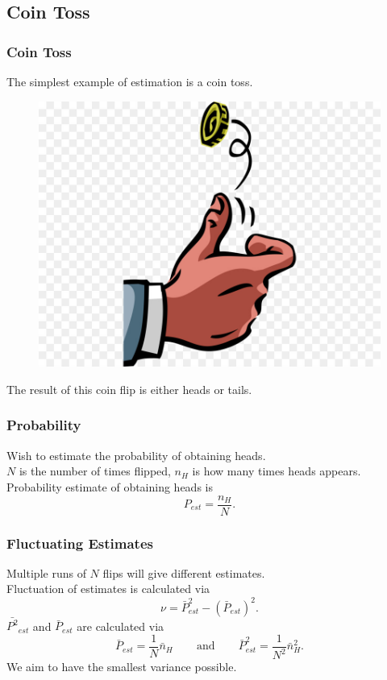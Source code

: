 \documentclass{beamer}
\begin{document}
\subsection{\tiny{Coin Toss}}
\begin{frame}
\frametitle{Coin Toss}
The simplest example of estimation is a coin toss.
\begin{figure}
\begin{center}
\includegraphics[width=0.75\linewidth]{Coin-Flip-Cartoon.jpeg}
\end{center}
\end{figure}
The result of this coin flip is either heads or tails.
\end{frame}
\begin{frame}
\frametitle{Probability}
Wish to estimate the probability of obtaining heads. \\
\vspace{10pt}
$N$ is the number of times flipped,  $n_H$ is how many times heads appears. \\
\vspace{10pt}
Probability estimate of obtaining heads is
\begin{equation}\label{eq:1}
P_{est}=\frac{n_H}{N}.
\end{equation}
\end{frame}
\begin{frame}
\frametitle{Fluctuating Estimates}
Multiple runs of $\textit{N}$ flips will give different estimates. \\
\vspace{10pt}
Fluctuation of estimates is calculated via
\begin{equation}\label{eq:2}
\nu=\bar{P}^2_{est}-(\bar{P}_{est})^2.
\end{equation}
$\bar{P^2}_{est}$ and $\bar{P}_{est}$ are calculated via
\begin{equation}\label{eq:3}
\bar{P}_{est}=\frac{1}{N}\bar{n}_H \hspace{25pt} \text{and} \hspace{25pt} \bar{P}^2_{est}=\frac{1}{N^2}\bar{n}^2_{H}.
\end{equation}
We aim to have the smallest variance possible.
\end{frame}
\end{document}
